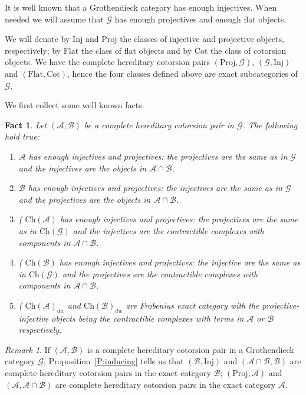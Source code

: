 \documentclass[11pt,a4paper,reqno]{amsart}
\newcommand{\A}{\mathcal{A}}
\newcommand{\B}{\mathcal{B}}
\newcommand{\G}{\mathcal{G}}
\newcommand{\Ch}{\mathrm{Ch}}
\newcommand{\Flat}{\mathrm{Flat}}
\newcommand{\Cot}{\mathrm{Cot}}
\newcommand{\Inj}{\mathrm{Inj}}
\newcommand{\Proj}{\mathrm{Proj}}
\theoremstyle{plain}
\newtheorem{fact}[thm]{Fact}
\theoremstyle{definition}
\theoremstyle{remark}
\newtheorem{rem}[thm]{Remark}
\begin{document}
 It is well known that a Grothendieck category has enough injectives.
When needed we will assume that $\G$ has enough projectives and enough flat objects.

We will denote by $\Inj$ and $\Proj$ the classes of injective and projective objects, respectively; by $\Flat$ the class of flat objects and by $\Cot$ the class of cotorsion objects.  We have the complete hereditary cotorsion pairs $(\Proj, \G)$, $(\G, \Inj)$ and $(\Flat, \Cot)$, hence the four classes defined above are exact subcategories of $\G$.

We first collect some well known facts.
\begin{fact}\label{F:proj-inj} Let $(\A, \B)$ be a complete hereditary cotorsion pair in $\G$. The following hold true:
\begin{enumerate}
\item $\A$ has enough injectives and projectives: the projectives are the same as in $\G$ and the injectives are the objects in $\A\cap\B$.
\item $\B$ has enough injectives and projectives: the injectives are the same as in $\G$ and the projectives are the objects in $\A\cap\B$.
\item (\cite[Corollary 2.9]{G7} $\Ch(\A)$ has enough injectives and projectives: the projectives are the same as in $\Ch(\G)$ and the injectives are the contractible complexes with components in $\A\cap\B$.
\item (\cite[Corollary 2.9]{G7} $\Ch(\B)$ has enough injectives and projectives: the injective are the same as in $\Ch(\G)$ and the projectives are the contractible complexes with components in $\A\cap\B$.
\item (\cite[Corollary 2.8]{G7} $\Ch(\A)_{dw}$ and $\Ch(\B)_{dw}$ are Frobenius exact category with the  projective-injective objects being the contractible complexes with terms in $\A$ or $\B$ respectively.
\end{enumerate}
\end{fact}

%
%
%

\begin{rem}\label{R:induced} If $(\A, \B)$ is a complete hereditary cotorsion pair in a Grothendieck category $\G$, Proposition~\ref{P:inducing} tells us that $(\B, \Inj)$ and $(\A\cap \B, \B)$  are complete hereditary cotorsion pairs in the exact category $\B$; $(\Proj, \A)$ and $(\A, \A\cap \B)$ are complete hereditary cotorsion pairs  in the exact category $\A$.
\end{rem}
\end{document}
